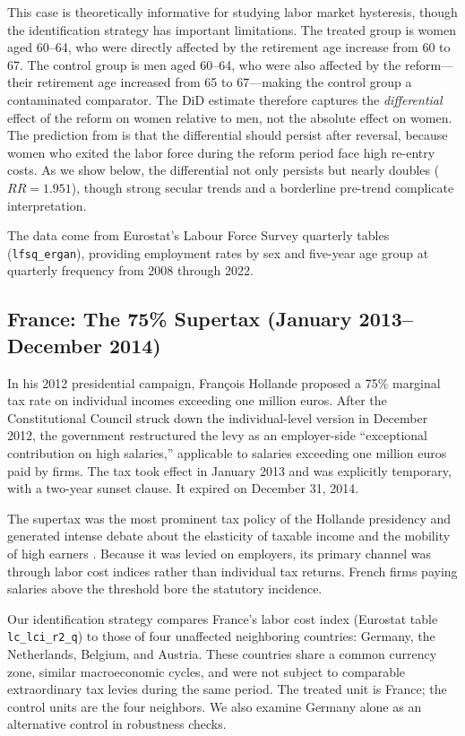 \documentclass[12pt]{article}
\begin{document}
This case is theoretically informative for studying labor market hysteresis, though the identification strategy has important limitations. The treated group is women aged 60--64, who were directly affected by the retirement age increase from 60 to 67. The control group is men aged 60--64, who were also affected by the reform---their retirement age increased from 65 to 67---making the control group a contaminated comparator. The DiD estimate therefore captures the \textit{differential} effect of the reform on women relative to men, not the absolute effect on women. The prediction from  is that the differential should persist after reversal, because women who exited the labor force during the reform period face high re-entry costs. As we show below, the differential not only persists but nearly doubles ($RR = 1.951$), though strong secular trends and a borderline pre-trend complicate interpretation.

The data come from Eurostat's Labour Force Survey quarterly tables (\texttt{lfsq\_ergan}), providing employment rates by sex and five-year age group at quarterly frequency from 2008 through 2022.

\subsection{France: The 75\% Supertax (January 2013--December 2014)}

In his 2012 presidential campaign, Fran\c{c}ois Hollande proposed a 75\% marginal tax rate on individual incomes exceeding one million euros. After the Constitutional Council struck down the individual-level version in December 2012, the government restructured the levy as an employer-side ``exceptional contribution on high salaries,'' applicable to salaries exceeding one million euros paid by firms. The tax took effect in January 2013 and was explicitly temporary, with a two-year sunset clause. It expired on December 31, 2014.

The supertax was the most prominent tax policy of the Hollande presidency and generated intense debate about the elasticity of taxable income and the mobility of high earners \citep{piketty2014optimal, saez2012elasticity, kleven2014migration}. Because it was levied on employers, its primary channel was through labor cost indices rather than individual tax returns. French firms paying salaries above the threshold bore the statutory incidence.

Our identification strategy compares France's labor cost index (Eurostat table \texttt{lc\_lci\_r2\_q}) to those of four unaffected neighboring countries: Germany, the Netherlands, Belgium, and Austria. These countries share a common currency zone, similar macroeconomic cycles, and were not subject to comparable extraordinary tax levies during the same period. The treated unit is France; the control units are the four neighbors. We also examine Germany alone as an alternative control in robustness checks.
\end{document}
